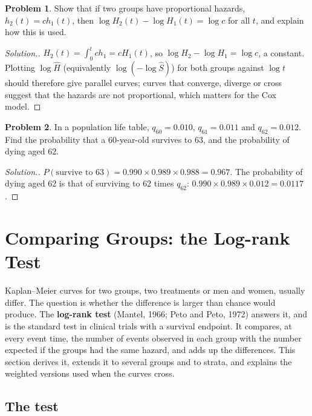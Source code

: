 \documentclass[11pt,a4paper]{article}
\numberwithin{equation}{section}
\theoremstyle{definition}
\newtheorem{problemx}{Problem}[subsection]
\newenvironment{problem}{\begin{problemx}}{\end{problemx}}
\newenvironment{solution}
  {\renewcommand{\qedsymbol}{}\begin{proof}[\textit{Solution}.]}
  {\end{proof}}
\begin{document}
\begin{problem}
Show that if two groups have proportional hazards, $h_2(t) = ch_1(t)$, then $\log H_2(t) - \log H_1(t) = \log c$ for all $t$, and explain how this is used.
\end{problem}

\begin{solution}
$H_2(t) = \int_0^tch_1 = cH_1(t)$, so $\log H_2 - \log H_1 = \log c$, a constant. Plotting $\log\hat H$ (equivalently $\log(-\log\hat S)$) for both groups against $\log t$ should therefore give parallel curves; curves that converge, diverge or cross suggest that the hazards are not proportional, which matters for the Cox model.
\end{solution}

\begin{problem}
In a population life table, $q_{60} = 0.010$, $q_{61} = 0.011$ and $q_{62} = 0.012$. Find the probability that a $60$-year-old survives to $63$, and the probability of dying aged $62$.
\end{problem}

\begin{solution}
$P(\text{survive to } 63) = 0.990 \times 0.989 \times 0.988 = 0.967$. The probability of dying aged $62$ is that of surviving to $62$ times $q_{62}$: $0.990 \times 0.989 \times 0.012 = 0.0117$.
\end{solution}

\section{Comparing Groups: the Log-rank Test}
\label{sec:logrank}

Kaplan--Meier curves for two groups, two treatments or men and women, usually differ. The question is whether the difference is larger than chance would produce. The \textbf{log-rank test} (Mantel, 1966; Peto and Peto, 1972) answers it, and is the standard test in clinical trials with a survival endpoint. It compares, at every event time, the number of
events observed in each group with the number expected if the groups had the same hazard, and adds up the differences. This section derives it, extends it to several groups and to strata, and explains the weighted versions used when the curves cross.

\subsection{The test}
\label{ssec:logranktest}
\end{document}
